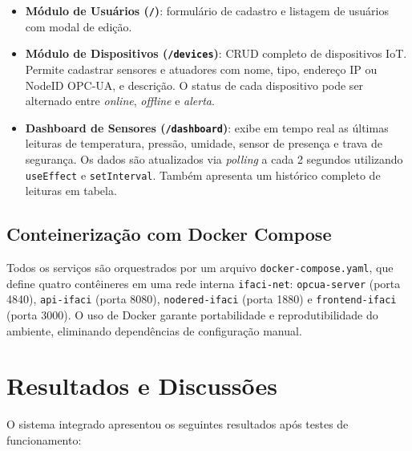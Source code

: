 \documentclass[12pt]{unisenaiclass}
\begin{document}
\begin{itemize}
    \item \textbf{Módulo de Usuários (\texttt{/})}: formulário de cadastro e listagem de
    usuários com modal de edição.

    \item \textbf{Módulo de Dispositivos (\texttt{/devices})}: CRUD completo de
    dispositivos IoT. Permite cadastrar sensores e atuadores com nome, tipo, endereço IP
    ou NodeID OPC-UA, e descrição. O status de cada dispositivo pode ser alternado entre
    \textit{online}, \textit{offline} e \textit{alerta}.

    \item \textbf{Dashboard de Sensores (\texttt{/dashboard})}: exibe em tempo real as
    últimas leituras de temperatura, pressão, umidade, sensor de presença e trava de
    segurança. Os dados são atualizados via \textit{polling} a cada 2 segundos utilizando
    \texttt{useEffect} e \texttt{setInterval}. Também apresenta um histórico completo de
    leituras em tabela.
\end{itemize}

\subsection{Conteinerização com Docker Compose}

Todos os serviços são orquestrados por um arquivo \texttt{docker-compose.yaml}, que define
quatro contêineres em uma rede interna \texttt{ifaci-net}: \texttt{opcua-server} (porta
4840), \texttt{api-ifaci} (porta 8080), \texttt{nodered-ifaci} (porta 1880) e
\texttt{frontend-ifaci} (porta 3000). O uso de Docker garante portabilidade e reprodutibilidade
do ambiente, eliminando dependências de configuração manual.

\section{Resultados e Discussões}

O sistema integrado apresentou os seguintes resultados após testes de funcionamento:
\end{document}
